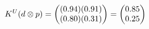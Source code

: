 \documentclass[preview]{standalone}
\begin{document}
\begin{align*}
\special{dvisvgm:raw <g id='unique000'>}K^U(d \otimes p) = \begin{pmatrix} (0.94)(0.91) \\ (0.80)(0.31) \end{pmatrix} = \begin{pmatrix} 0.85 \\ 0.25 \end{pmatrix}\special{dvisvgm:raw </g>}
\end{align*}
\end{document}
